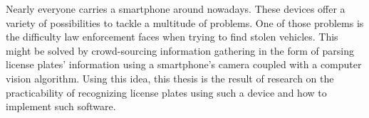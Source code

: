 \samenvatting

Nearly everyone carries a smartphone around nowadays. These devices offer a variety of possibilities to tackle a multitude of problems. One of those problems is the difficulty law enforcement faces when trying to find stolen vehicles. This might be solved by crowd-sourcing information gathering in the form of parsing license plates' information using a smartphone's camera coupled with a computer vision algorithm. Using this idea, this thesis is the result of research on the practicability of recognizing license plates using such a device and how to implement such software.
